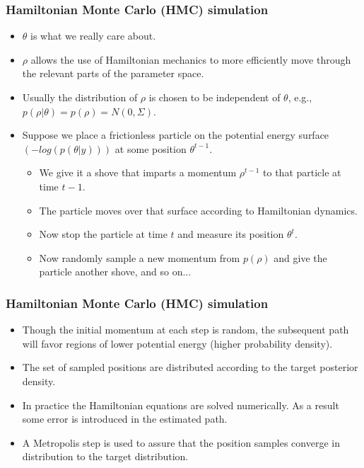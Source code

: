 \documentclass{beamer}
\begin{document}
\begin{frame}
  \frametitle{Hamiltonian Monte Carlo (HMC) simulation}
  
  \begin{itemize}
  \item $\theta$ is what we really care about.
  \item $\rho$ allows the use of Hamiltonian mechanics to more
    efficiently move through the relevant parts of the parameter
    space.
  \item Usually the distribution of $\rho$ is chosen to be independent of
    $\theta$, e.g.,
    $p(\rho | \theta) = p(\rho) = N\left(0, \Sigma\right)$.
  \item Suppose we place a frictionless particle on the potential
    energy surface $\left(-log\left(p\left(\theta |
          y\right)\right)\right)$ at some position $\theta^{t-1}$.
    \begin{itemize}
    \item We give it a shove that imparts a momentum $\rho^{t-1}$ to that
      particle at time $t-1$.
    \item The particle moves over that surface according to
      Hamiltonian dynamics.
    \item Now stop the particle at time $t$ and measure its
      position $\theta^t$.
    \item Now randomly sample a new momentum from $p(\rho)$ and give
      the particle another shove, and so on...
    \end{itemize}
  \end{itemize}

\end{frame}

\begin{frame}
  \frametitle{Hamiltonian Monte Carlo (HMC) simulation}
  
  \begin{itemize}
  \item Though the initial momentum at each step is random, the
    subsequent path will favor regions of lower potential energy
    (higher probability density).
  \item The set of sampled positions are distributed according to the
    target posterior density.
  \item In practice the Hamiltonian equations are solved
    numerically. As a result some error is introduced in the estimated
    path.
  \item A Metropolis step is used to assure that the position samples
    converge in distribution to the target distribution.
  \end{itemize}

\end{frame}
\end{document}

